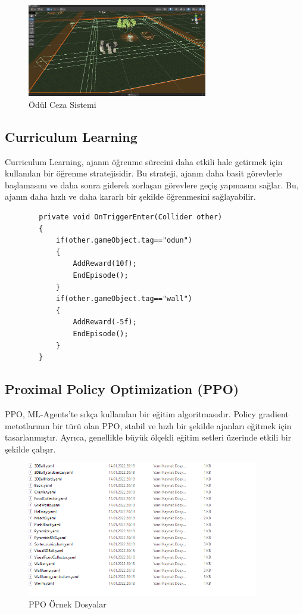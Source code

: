 \documentclass{article}
\begin{document}
        \begin{figure}[h]
    \centering
    \includegraphics[width=0.7\textwidth]{odulceza.PNG}
    \caption{Ödül Ceza Sistemi}
    \label{fig:resim14}
    \end{figure}
    

    \subsection{Curriculum Learning}
        Curriculum Learning, ajanın öğrenme sürecini daha etkili hale getirmek için kullanılan bir öğrenme stratejisidir. Bu strateji, ajanın daha basit görevlerle başlamasını ve daha sonra giderek zorlaşan görevlere geçiş yapmasını sağlar. Bu, ajanın daha hızlı ve daha kararlı bir şekilde öğrenmesini sağlayabilir.
        \vspace{0,15cm}
        \footnotesize
        \begin{verbatim}
        private void OnTriggerEnter(Collider other)
        {
            if(other.gameObject.tag=="odun")
            {
                AddReward(10f);
                EndEpisode();
            }
            if(other.gameObject.tag=="wall")
            {
                AddReward(-5f);
                EndEpisode();
            }
        }
\end{verbatim}
        \clearpage

    \subsection{Proximal Policy Optimization (PPO)}
        PPO, ML-Agents'te sıkça kullanılan bir eğitim algoritmasıdır. Policy gradient metotlarının bir türü olan PPO, stabil ve hızlı bir şekilde ajanları eğitmek için tasarlanmıştır. Ayrıca, genellikle büyük ölçekli eğitim setleri üzerinde etkili bir şekilde çalışır.
        \begin{figure}[h]
    \centering
    \includegraphics[width=0.9\textwidth]{yaml.PNG}
    \caption{PPO Örnek Dosyalar}
    \label{fig:resim15}
\end{figure}
\end{document}
